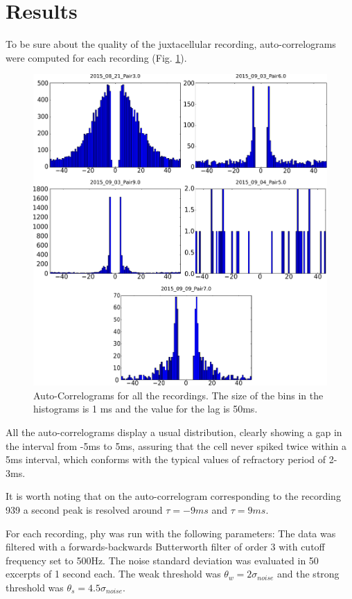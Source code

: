 \documentclass{article}
\begin{document}
\section{Results}
\label{sec:chap2-results}
To be sure about the quality of the juxtacellular recording, auto-correlograms were computed for each recording (Fig. \ref{fig:AC}).
\begin{figure}[!h]
	\centering
	\includegraphics[width=\linewidth]{AC.pdf}
	\caption{Auto-Correlograms for all the recordings. The size of the bins in the histograms is 1 ms and the value for the lag is 50ms.
}
\label{fig:AC}
\end{figure}

All the auto-correlograms display a usual distribution, clearly showing a gap in the interval from -5ms to 5ms, assuring that the cell never spiked twice  within a 5ms interval, which conforms with the typical values of refractory period of 2-3ms.

It is worth noting that on the auto-correlogram corresponding to the recording 939 a second peak is resolved around $\tau = -9 ms$ and $\tau = 9 ms$.

For each recording, phy was run with the following parameters:
The data was filtered with a forwards-backwards Butterworth filter of order 3 with cutoff frequency set to 500Hz. The noise standard deviation was evaluated in 50 excerpts of 1 second each. The weak threshold was $\theta_w = 2 \sigma_{noise}$ and the strong threshold was $\theta_s = 4.5 \sigma_{noise}$.
\end{document}
